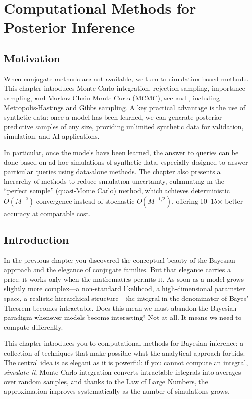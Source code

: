 \startcontents[chapter]
\chapter{Computational Methods for Posterior Inference}\label{ch:ComputationalMethodPosterior}
\minitocboxed

\section*{Motivation}
When conjugate methods are not available, we turn to simulation‑based methods. This chapter introduces Monte Carlo integration, rejection sampling, importance sampling, and Markov Chain Monte Carlo (MCMC), see \cite{RobertCasella2004} and \cite{BrooksGelman1998}, including Metropolis‑Hastings and Gibbs sampling. A key practical advantage is the use of synthetic data: once a model has been learned, we can generate posterior predictive samples of any size, providing unlimited synthetic data for validation, simulation, and AI applications.

In particular, once the models have been learned, the answer to queries can be done based on ad‑hoc simulations of synthetic data, especially designed to answer particular queries using data‑alone methods. The chapter also presents a hierarchy of methods to reduce simulation uncertainty, culminating in the “perfect sample” (quasi‑Monte Carlo) method, which achieves deterministic $O(M^{-2})$ convergence instead of stochastic $O(M^{-1/2})$, offering 10–15× better accuracy at comparable cost.

\section{Introduction}\label{sec:computational_methods}
In the previous chapter you discovered the conceptual beauty of the Bayesian approach and the elegance of conjugate families. But that elegance carries a price: it works only when the mathematics permits it. As soon as a model grows slightly more complex---a non-standard likelihood, a high-dimensional parameter space, a realistic hierarchical structure---the integral in the denominator of Bayes' Theorem becomes intractable. Does this mean we must abandon the Bayesian paradigm whenever models become interesting? Not at all. It means we need to compute differently.

This chapter introduces you to computational methods for Bayesian inference: a collection of techniques that make possible what the analytical approach forbids. The central idea is as elegant as it is powerful: if you cannot compute an integral, \emph{simulate it}. Monte Carlo integration converts intractable integrals into averages over random samples, and thanks to the Law of Large Numbers, the approximation improves systematically as the number of simulations grows.

